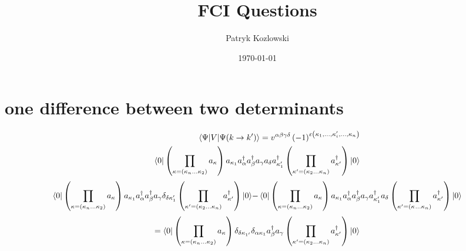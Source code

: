 \documentclass[12pt]{article}
\title{FCI Questions}
\author{Patryk Kozlowski}
\date{\today}
\begin{document}
\maketitle

\section{one difference between two determinants}
\begin{subequations}
    \begin{align}
        \mel{\Psi }{V}{\Psi (k\rightarrow k^{\prime})}
    =v^{\alpha\beta\gamma\delta}\left(-1\right)^{\varepsilon\left(\kappa_{1},\dots,\kappa_{i}^{\prime},\dots,\kappa_{n}\right)}\\
    \bra{0}\left(\prod_{\kappa=\left(\kappa_{n}\dots\kappa_{2}\right)}a_{\kappa}\right)
        a_{\kappa _{1}}a^{\dag}_{\alpha }a^{\dag}_{\beta }a_{\gamma }a_{\delta }a^{\dag}_{\kappa ^{\prime}_{1}}
    \left(\prod_{\kappa^{\prime}=\left(\kappa_{2}\dots\kappa_{n}\right)}a^{\dag}_{\kappa^{\prime}}\right)\ket{0}
    \end{align}
\end{subequations}
\begin{subequations}
    \begin{align}
        \bra{0}\left(\prod_{\kappa=\left(\kappa_{n}\dots\kappa_{2}\right)}a_{\kappa}\right)
            a_{\kappa _{1}}a^{\dag}_{\alpha }a^{\dag}_{\beta }a_{\gamma }\delta _{\delta  \kappa _{1}^{\prime}}
        \left(\prod_{\kappa^{\prime}=\left(\kappa_{2}\dots\kappa_{n}\right)}a^{\dag}_{\kappa^{\prime}}\right)\ket{0}
    \end{align}
    \begin{align}
        -\bra{0}\left(\prod_{\kappa=\left(\kappa_{n}\dots\kappa_{2}\right)}a_{\kappa}\right)
            a_{\kappa _{1}}a^{\dag}_{\alpha }a^{\dag}_{\beta }a_{\gamma }a^{\dag}_{\kappa _{1}^{\prime}}a_{\delta }
        \left(\prod_{\kappa^{\prime}=\left(\kappa_{}\dots\kappa_{n}\right)}a^{\dag}_{\kappa^{\prime}}\right)\ket{0}
    \end{align}
\end{subequations}
\begin{equation}
    =\bra{0}\left(\prod_{\kappa=\left(\kappa_{n}\dots\kappa_{2}\right)}a_{\kappa}\right)
        \delta _{\delta  \kappa _{1^{\prime}}}\delta _{\alpha  \kappa _{1}}a^{\dag}_{\beta }a_{\gamma }
    \left(\prod_{\kappa^{\prime}=\left(\kappa_{2}\dots\kappa_{n}\right)}a^{\dag}_{\kappa^{\prime}}\right)\ket{0}
\end{equation}
\end{document}
